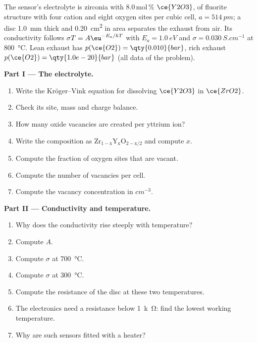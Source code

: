 \begin{problem}
\label{pb:b3:solid-state:1}
The sensor's electrolyte is zirconia with 8.0\,mol\,\% $\ce{Y2O3}$, of fluorite structure
with four cation and eight oxygen sites per cubic cell, $a = \qty{514}{pm}$; a disc
\qty{1.0}{mm} thick and \qty{0.20}{cm^2} in area separates the exhaust from air. Its
conductivity follows $\sigma T = A\eu^{-E_a/kT}$ with $E_a = \qty{1.0}{eV}$ and $\sigma = \qty{0.030}{S.cm^{-1}}$ at \qty{800}{\celsius}. Lean
exhaust has $p(\ce{O2}) = \qty{0.010}{bar}$, rich exhaust $p(\ce{O2}) = \qty{1.0e-20}{bar}$ (all data of the problem).

\medskip\noindent\textbf{Part I --- The electrolyte.}
\begin{enumerate}
  \item Write the Kröger--Vink equation for dissolving $\ce{Y2O3}$ in $\ce{ZrO2}$.
  \item Check its site, mass and charge balance.
  \item How many oxide vacancies are created per yttrium ion?
  \item Write the composition as $\mathrm{Zr_{1-x}Y_xO_{2-x/2}}$ and compute $x$.
  \item Compute the fraction of oxygen sites that are vacant.
  \item Compute the number of vacancies per cell.
  \item Compute the vacancy concentration in $\unit{cm^{-3}}$.
\end{enumerate}

\medskip\noindent\textbf{Part II --- Conductivity and temperature.}
\begin{enumerate}[resume]
  \item Why does the conductivity rise steeply with temperature?
  \item Compute $A$.
  \item Compute $\sigma$ at \qty{700}{\celsius}.
  \item Compute $\sigma$ at \qty{300}{\celsius}.
  \item Compute the resistance of the disc at these two temperatures.
  \item The electronics need a resistance below \qty{1}{k\ohm}: find the lowest working
        temperature.
  \item Why are such sensors fitted with a heater?
\end{enumerate}


\end{problem}
